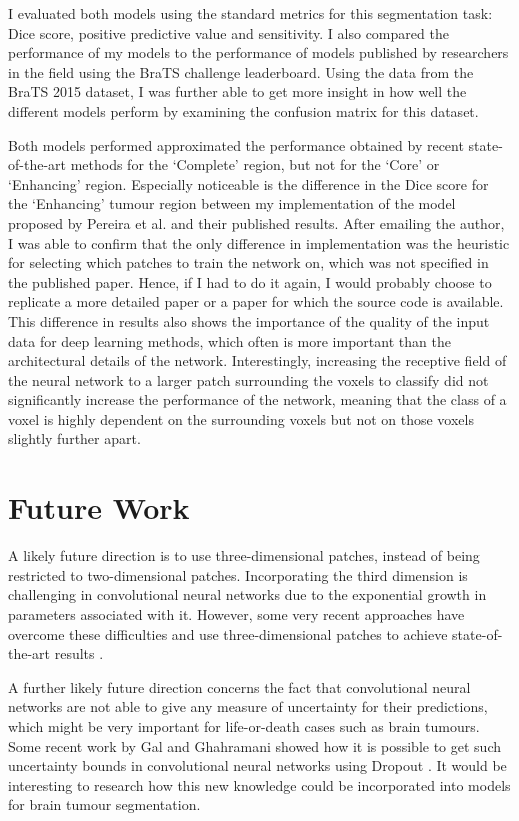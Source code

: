 \documentclass[12pt,a4paper,twoside,openright]{report}
\begin{document}
I evaluated both models using the standard metrics for this segmentation task: Dice score, positive predictive value and sensitivity. I also compared the performance of my models to the performance of models published by researchers in the field using the BraTS challenge leaderboard. Using the data from the BraTS 2015 dataset, I was further able to get more insight in how well the different models perform by examining the confusion matrix for this dataset.

Both models performed approximated the performance obtained by recent state-of-the-art methods for the `Complete' region, but not for the `Core' or `Enhancing' region. Especially noticeable is the difference in the Dice score for the `Enhancing' tumour region between my implementation of the model proposed  by Pereira et al. and their published results. After emailing the author, I was able to confirm that the only difference in implementation was the heuristic for selecting which patches to train the network on, which was not specified in the published paper. Hence, if I had to do it again, I would probably choose to replicate a more detailed paper or a paper for which the source code is available. This difference in results also shows the importance of the quality of the input data for deep learning methods, which often is more important than the architectural details of the network. Interestingly, increasing the receptive field of the neural network to a larger patch surrounding the voxels to classify did not significantly increase the performance of the network, meaning that the class of a voxel is highly dependent on the surrounding voxels but not on those voxels slightly further apart.

\section{Future Work}
A likely future direction is to use three-dimensional patches, instead of being restricted to two-dimensional patches. Incorporating the third dimension is challenging in convolutional neural networks due to the exponential growth in parameters associated with it. However, some very recent approaches have overcome these difficulties and use three-dimensional patches to achieve state-of-the-art results \cite{kamnitsas}. 

A further likely future direction concerns the fact that convolutional neural networks are not able to give any measure of uncertainty for their predictions, which might be very important for life-or-death cases such as brain tumours. Some recent work by Gal and Ghahramani showed how it is possible to get such uncertainty bounds in convolutional neural networks using Dropout \cite{Gal2015Dropout}. It would be interesting to research how this new knowledge could be incorporated into models for brain tumour segmentation.
\end{document}
